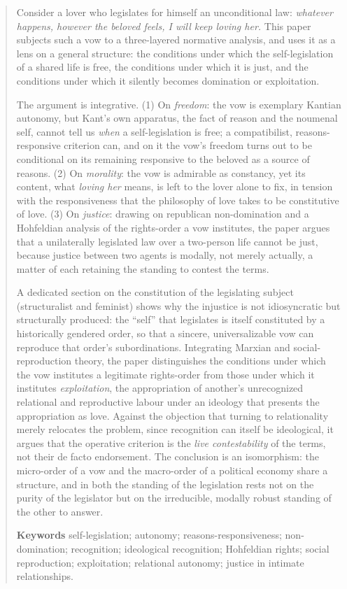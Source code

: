 \documentclass[11pt,a4paper]{article}
\begin{document}
\begin{abstract}
\noindent
Consider a lover who legislates for himself an unconditional law: \emph{whatever happens, however the beloved feels, I will keep loving her.} This paper subjects such a vow to a three-layered normative analysis, and uses it as a lens on a general structure: the conditions under which the self-legislation of a shared life is free, the conditions under which it is just, and the conditions under which it silently becomes domination or exploitation.

\smallskip
\noindent The argument is integrative. (1) On \emph{freedom}: the vow is exemplary Kantian autonomy, but Kant's own apparatus, the fact of reason and the noumenal self, cannot tell us \emph{when} a self-legislation is free; a compatibilist, reasons-responsive criterion can, and on it the vow's freedom turns out to be conditional on its remaining responsive to the beloved as a source of reasons. (2) On \emph{morality}: the vow is admirable as constancy, yet its content, what \emph{loving her} means, is left to the lover alone to fix, in tension with the responsiveness that the philosophy of love takes to be constitutive of love. (3) On \emph{justice}: drawing on republican non-domination and a Hohfeldian analysis of the rights-order a vow institutes, the paper argues that a unilaterally legislated law over a two-person life cannot be just, because justice between two agents is modally, not merely actually, a matter of each retaining the standing to contest the terms.

\smallskip
\noindent A dedicated section on the constitution of the legislating subject (structuralist and feminist) shows why the injustice is not idiosyncratic but structurally produced: the ``self'' that legislates is itself constituted by a historically gendered order, so that a sincere, universalizable vow can reproduce that order's subordinations. Integrating Marxian and social-reproduction theory, the paper distinguishes the conditions under which the vow institutes a legitimate rights-order from those under which it institutes \emph{exploitation}, the appropriation of another's unrecognized relational and reproductive labour under an ideology that presents the appropriation as love. Against the objection that turning to relationality merely relocates the problem, since recognition can itself be ideological, it argues that the operative criterion is the \emph{live contestability} of the terms, not their de facto endorsement. The conclusion is an isomorphism: the micro-order of a vow and the macro-order of a political economy share a structure, and in both the standing of the legislation rests not on the purity of the legislator but on the irreducible, modally robust standing of the other to answer.

\vspace{0.6em}
\noindent\textbf{Keywords}\quad
self-legislation; autonomy; reasons-responsiveness; non-domination; recognition; ideological recognition; Hohfeldian rights; social reproduction; exploitation; relational autonomy; justice in intimate relationships.
\end{abstract}
\end{document}
